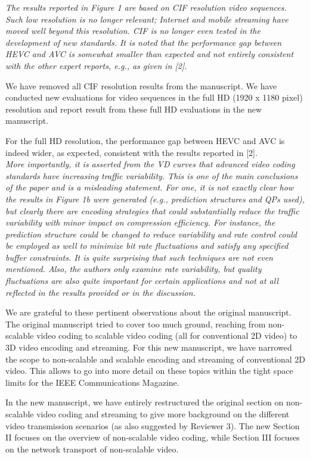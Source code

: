 \documentclass[11pt, draftclsnofoot, onecolumn]{IEEEtran}
\begin{document}
{{\noindent \textit{The results reported in Figure 1 are based on CIF
  resolution video sequences. Such low resolution is no longer
  relevant; Internet and mobile streaming have moved well beyond this
  resolution. CIF is no longer even tested in the development of new
  standards. It is noted that the performance gap between HEVC and AVC
  is somewhat smaller than expected and not entirely consistent with
  the other expert reports, e.g., as given in [2].}

We have removed all CIF resolution results from the manuscript.
We have conducted new evaluations for video sequences in
the full HD (1920 x 1180 pixel) resolution and report result from these
full HD evaluations in the new manuscript.

For the full HD resolution, the performance gap between HEVC and AVC
is indeed wider, as expected, consistent with
the results reported in [2].\\


\noindent \textit{More importantly, it is asserted from the VD curves
  that advanced video coding standards have increasing traffic
  variability. This is one of the main conclusions of the paper and is
  a misleading statement. For one, it is not exactly clear how the
  results in Figure 1b were generated (e.g., prediction structures and
  QPs used), but clearly there are encoding strategies that could
  substantially reduce the traffic variability with minor impact on
  compression efficiency. For instance, the prediction structure could
  be changed to reduce variability and rate control could be employed
  as well to minimize bit rate fluctuations and satisfy any specified
  buffer constraints. It is quite surprising that such techniques are
  not even mentioned. Also, the authors only examine rate variability,
  but quality fluctuations are also quite important for certain
  applications and not at all reflected in the results provided or in
  the discussion. }

We are grateful to these pertinent observations about the original
manuscript. The original manuscript tried to cover too much ground,
reaching from non-scalable video coding to scalable video coding
(all for conventional 2D video) to 3D video encoding and streaming.
For this new manuscript, we have narrowed the scope to
non-scalable and scalable encoding and streaming of conventional
2D video. This allows to go into more detail on these topics
within the tight space limits for the IEEE Communications Magazine.

In the new manuscript, we have entirely restructured the
original section on non-scalable video coding and streaming to give more
background on the different video transmission scenarios (as also
suggested by Reviewer 3).
The new Section II focuses on the overview of non-scalable video coding, while
Section III focuses on the network transport of non-scalable video.

}}
\end{document}
